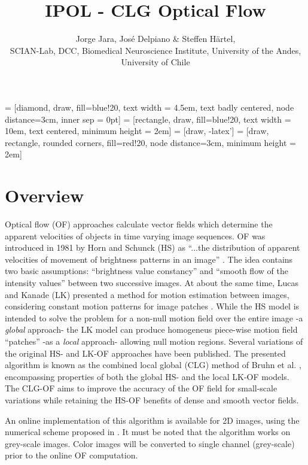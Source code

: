 \documentclass{article}
\begin{document}
 = [diamond, draw, fill=blue!20, text width = 4.5em,
                    text badly centered, node distance=3cm, inner sep = 0pt]
= [rectangle, draw, fill=blue!20, text width = 10em,
                    text centered, minimum height = 2em]
 = [draw, -latex']
 = [draw, rectangle, rounded corners, fill=red!20,
                    node distance=3cm, minimum height = 2em]

\title{IPOL - CLG Optical Flow}
\author{Jorge Jara, Jos{\'e} Delpiano \& Steffen H{\"a}rtel,\\
SCIAN-Lab, DCC, Biomedical Neuroscience Institute, University of the Andes,\\
University of Chile}
\maketitle

\section{Overview}
Optical flow (OF) approaches calculate vector fields which determine the 
apparent velocities of objects in time varying image sequences. OF was introduced 
in 1981 by Horn and Schunck (HS) as ``...the distribution of apparent velocities 
of movement of brightness patterns in an image'' \cite{HS81}. The idea contains 
two basic assumptions: ``brightness value constancy'' and ``smooth flow of the 
intensity values'' between two successive images. At about the same time, Lucas 
and Kanade (LK) presented a method for motion estimation between images, 
considering constant motion patterns for image patches \cite{LK81}. While the HS 
model is intended to solve the problem for a non-null motion field over the 
entire image -a \textit{global} approach- the LK model can produce homogeneus 
piece-wise motion field ``patches'' -as a \textit{local} approach- allowing null 
motion regions. Several variations of the original HS- and LK-OF approaches have 
been published. The presented algorithm is known as the combined local global 
(CLG) method of Bruhn et al. \cite{Bruhn02}, encompassing properties of both the 
global HS- and the local LK-OF models. The CLG-OF aims to improve the accuracy 
of the OF field for small-scale variations while retaining the HS-OF benefits of 
dense and smooth vector fields.


An online implementation of this algorithm is available for 2D images, using the 
numerical scheme proposed in \cite{Bruhn05rt}. It must be noted that the 
algorithm works on grey-scale images. Color images will be converted to single 
channel (grey-scale) prior to the online OF computation.
\end{document}
